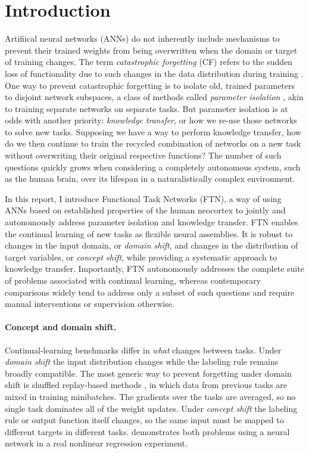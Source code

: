 \documentclass[11pt]{article}
\begin{document}
\section{Introduction}\label{sec:intro}
Artifiical neural networks (ANNs) do not inherently include mechanisms to prevent their trained weights from being overwritten when the domain or target of training changes.
The term \textit{catastrophic forgetting} (CF) refers to the sudden loss of functionality due to such changes in the data distribution during training \citep{mccloskey1989catastrophic,french1999catastrophic}.
One way to prevent catastrophic forgetting is to isolate old, trained parameters to disjoint network subspaces, a class of methods called \textit{parameter isolation} \citep{mallya2018packnet,serra2018overcoming,wortsman2020supermasks}, akin to training separate networks on separate tasks.
But parameter isolation is at odds with another priority: \textit{knowledge transfer}, or how we re-use those networks to solve new tasks.
Supposing we have a way to perform knowledge transfer, how do we then continue to train the recycled combination of networks on a new task without overwriting their original respective functions?
The number of such questions quickly grows when considering a completely autonomous system, such as the human brain, over its lifespan in a naturalistically complex environment.

In this report, I introduce Functional Task Networks (FTN), a way of using ANNs based on established properties of the human neocortex to jointly and autonomously address parameter isolation and knowledge transfer.
FTN enables the continual learning of new tasks as flexible neural assemblies.
It is robust to changes in the input domain, or \textit{domain shift}, and changes in the distribution of target variables, or \textit{concept shift}, while providing a systematic approach to knowledge transfer.
Importantly, FTN autonomously addresses the complete suite of problems associated with continual learning, whereas contemporary comparisons widely tend to address only a subset of such questions and require manual interventions or supervision otherwise.

\paragraph{Concept and domain shift.}
Continual-learning benchmarks differ in \emph{what} changes between tasks. Under \emph{domain shift} the input distribution changes while the labeling rule remains broadly compatible. The most generic way to prevent forgetting under domain shift is shuffled replay-based methods \citep{lopez2017gradient,chaudhry2018efficient,buzzega2020dark}, in which data from previous tasks are mixed in training minibatches. The gradients over the tasks are averaged, so no single task dominates all of the weight updates. 
Under \emph{concept shift} the labeling rule or output function itself changes, so the same input must be mapped to different targets in different tasks. 
 demonstrates both problems using a neural network in a real nonlinear regression experiment.
\end{document}

